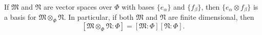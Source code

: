 If $\mathfrak{M}$ and $\mathfrak{N}$ are vector spaces over $\Phi$ with bases $\{e_\alpha\}$ and $\{f_\beta\}$, then $\{e_\alpha \otimes f_\beta\}$ is a basis for $\mathfrak{M} \otimes_\Phi \mathfrak{N}$. In particular, if both $\mathfrak{M}$ and $\mathfrak{N}$ are finite dimensional, then
$$[\mathfrak{M} \otimes_\Phi \mathfrak{N} : \Phi] = [\mathfrak{M} : \Phi][\mathfrak{N} : \Phi].$$
